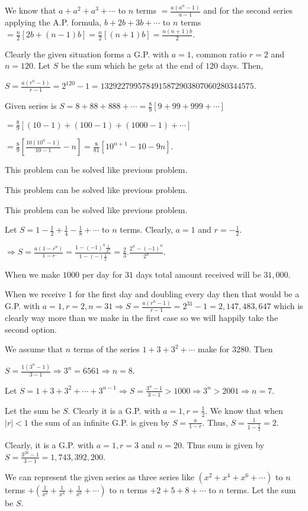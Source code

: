   We know that $a + a^2 + a^3 + \cdots$ to $n$ terms $= \frac{a(a^n - 1)}{a - 1}$ and for the second series
  applying the A.P. formula, $b + 2b + 3b + \cdots$ to $n$ terms $= \frac{n}{2}[2b + (n - 1)b] =
  \frac{n}{2}[(n + 1)b] = \frac{n(n + 1)b}{2}$.
\item Clearly the given situation forms a G.P. with $a = 1$, common ratio $r = 2$ and $n = 120$. Let $S$ be
  the sum which he gets at the end of $120$ days. Then,

  $S = \frac{a(r^n - 1)}{r - 1} = 2^{120} - 1 = 1329227995784915872903807060280344575$.
\item Given series is $S = 8 + 88 + 888 + \cdots = \frac{8}{9}[9 + 99 + 999 + \cdots]$

  $= \frac{8}{9}[(10 - 1) + (100 - 1) + (1000 - 1) + \cdots]$

  $= \frac{8}{9}\left[\frac{10(10^n - 1)}{10 - 1} - n\right] = \frac{8}{81}[10^{n + 1} - 10 - 9n]$.
\item This problem can be solved like previous problem.
\item This problem can be solved like previous problem.
\item This problem can be solved like previous problem.
\item Let $S = 1 - \frac{1}{2} + \frac{1}{4} - \frac{1}{8} + \cdots$ to $n$ terms. Clearly, $a = 1$ and $r =
  -\frac{1}{2}$.

  $\Rightarrow S = \frac{a(1 - r^n)}{1 - r} = \frac{1 - (-1)^n\frac{1}{2^n}}{1 -(-)\frac{1}{2}} =
  \frac{2}{3}.\frac{2^n - (-1)^n}{2^n}$.
\item When we make $1000$ per day for $31$ days total amount received will be $31,000$.

  When we receive $1$ for the first day and doubling every day then that would be a G.P. with $a = 1, r =
  2, n = 31 \Rightarrow S = \frac{a(r^n - 1)}{r - 1} = 2^{31} - 1 = 2,147,483,647$ which is clearly way more
  than we make in the first case so we will happily take the second option.
\item We assume that $n$ terms of the series $1 + 3 + 3^2 + \cdots$ make for $3280$. Then

  $S = \frac{1(3^n - 1)}{3 - 1} \Rightarrow 3^n = 6561 \Rightarrow n = 8$.
\item Let $S = 1 + 3 + 3^2 + \cdots + 3^{n - 1}\Rightarrow S = \frac{3^n - 1}{3 - 1} > 1000 \Rightarrow 3^n
  > 2001 \Rightarrow n = 7$.
\item Let the sum be $S$. Clearly it is a G.P. with $a = 1, r = \frac{1}{2}$. We know that when $|r| < 1$
  the sum of an infinite G.P. is given by $S = \frac{a}{1 - r}$. Thus, $S = \frac{1}{1- \frac{1}{2}} = 2$.
\item Clearly, it is a G.P. with $a = 1, r = 3$ and $n = 20$. Thus sum is given by $S = \frac{3^{20} - 1}{3
  - 1} = 1,743,392,200$.
\item We can represent the given series as three series like $(x^2 + x^4 + x^6 + \cdots)$ to $n$ terms $+
  \left(\frac{1}{x^2} + \frac{1}{x^4} + \frac{1}{x^6} + \cdots\right)$ to $n$ terms $+ 2 + 5 + 8 + \cdots$
  to $n$ terms. Let the sum be $S$.

